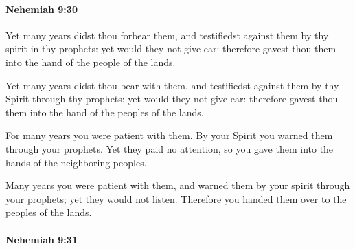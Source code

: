 		\paragraph{Nehemiah 9:30} %
			\label{NEHEMIAH-9-30}

			Yet many years didst thou forbear them, and testifiedst against them by thy spirit in thy prophets: yet would they not give ear: therefore gavest thou them into the hand of the people of the lands.

			\begin{versebox}
					\item[BHS] 
					\item[LXX] 
					\item[ASV] Yet many years didst thou bear with them, and testifiedst against them by thy Spirit through thy prophets: yet would they not give ear: therefore gavest thou them into the hand of the peoples of the lands.
					\item[NIV] For many years you were patient with them. By your Spirit you warned them through your prophets. Yet they paid no attention, so you gave them into the hands of the neighboring peoples.
					\item[NRSV] Many years you were patient with them, and warned them by your spirit through your prophets; yet they would not listen. Therefore you handed them over to the peoples of the lands.
			\end{versebox}

		\paragraph{Nehemiah 9:31} %
			\label{NEHEMIAH-9-31}

